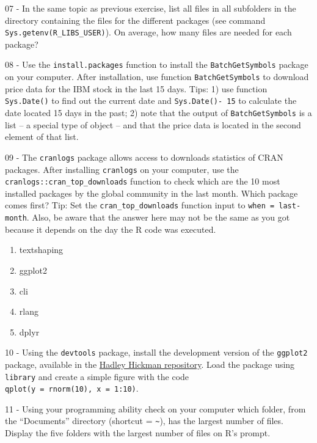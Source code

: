 \documentclass[
  12pt,
]{book}
\providecommand{\tightlist}{%
  \setlength{\itemsep}{0pt}\setlength{\parskip}{0pt}}
\begin{document}
07 -
In the same topic as previous exercise, list all files in all subfolders in the directory containing the files for the different packages (see command \texttt{Sys.getenv(\textquotesingle{}R\_LIBS\_USER\textquotesingle{})}). On average, how many files are needed for each package?

08 -
Use the \texttt{install.packages} function to install the \texttt{BatchGetSymbols} package on your computer. After installation, use function \texttt{BatchGetSymbols} to download price data for the IBM stock in the last 15 days. Tips: 1) use function \texttt{Sys.Date()} to find out the current date and \texttt{Sys.Date()-\ 15} to calculate the date located 15 days in the past; 2) note that the output of \texttt{BatchGetSymbols} is a list -- a special type of object -- and that the price data is located in the second element of that list.

09 -
The \texttt{cranlogs} package allows access to downloads statistics of CRAN packages. After installing \texttt{cranlogs} on your computer, use the \texttt{cranlogs::cran\_top\_downloads} function to check which are the 10 most installed packages by the global community in the last month. Which package comes first? Tip: Set the \texttt{cran\_top\_downloads} function input to \texttt{when\ =\ \textquotesingle{}last-month\textquotesingle{}}. Also, be aware that the answer here may not be the same as you got because it depends on the day the R code was executed.

\begin{enumerate}
\def\labelenumi{\alph{enumi})}
\tightlist
\item
  textshaping
\item
  ggplot2
\item
  cli
\item
  rlang
\item
  dplyr
\end{enumerate}

10 -
Using the \texttt{devtools} package, install the development version of the \texttt{ggplot2} package, available in the \href{https://github.com/hadley}{Hadley Hickman repository}. Load the package using \texttt{library} and create a simple figure with the code \texttt{qplot(y\ =\ rnorm(10),\ x\ =\ 1:10)}.

11 -
Using your programming ability check on your computer which folder, from the ``Documents'' directory (shortcut = \texttt{\textasciitilde{}}), has the largest number of files. Display the five folders with the largest number of files on R's prompt.
\end{document}
